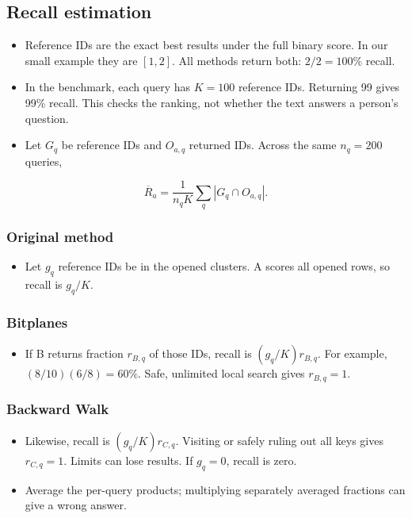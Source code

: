 \subsection{Recall estimation}
\begin{itemize}
\item Reference IDs are the exact best results under the full binary score. In our small
example they are $[1,2]$. All methods return both: $2/2=100\%$ recall.
\item In the benchmark, each query has $K=100$ reference IDs. Returning 99 gives 99\% recall.
This checks the ranking, not whether the text answers a person's question.
\end{itemize}
\begin{itemize}
\item Let $G_q$ be reference IDs and $O_{a,q}$ returned IDs. Across the same $n_q=200$ queries,
\end{itemize}
\[
 \overline R_a=\frac{1}{n_qK}\sum_q|G_q\cap O_{a,q}|.
\]
\subsubsection{Original method}
\begin{itemize}
\item Let $g_q$ reference IDs be in the opened clusters. A scores all opened rows, so recall is $g_q/K$.
\end{itemize}
\subsubsection{Bitplanes}
\begin{itemize}
\item If B returns fraction $r_{B,q}$ of those IDs, recall is $(g_q/K)r_{B,q}$. For example, $(8/10)(6/8)=60\%$. Safe, unlimited local search gives $r_{B,q}=1$.
\end{itemize}
\subsubsection{Backward Walk}
\begin{itemize}
\item Likewise, recall is $(g_q/K)r_{C,q}$. Visiting or safely ruling out all keys gives $r_{C,q}=1$. Limits can lose results. If $g_q=0$, recall is zero.
\item Average the per-query products; multiplying separately averaged fractions can give a wrong answer.
\end{itemize}

